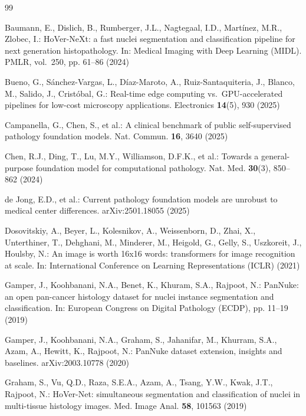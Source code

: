 \documentclass[runningheads]{llncs}
\begin{document}
%
%
\begin{thebibliography}{99}

Baumann, E., Dislich, B., Rumberger, J.L., Nagtegaal, I.D., Mart\'inez, M.R., Zlobec, I.: HoVer-NeXt: a fast nuclei segmentation and classification pipeline for next generation histopathology. In: Medical Imaging with Deep Learning (MIDL). PMLR, vol.~250, pp. 61--86 (2024)

Bueno, G., S\'anchez-Vargas, L., D\'iaz-Maroto, A., Ruiz-Santaquiteria, J., Blanco, M., Salido, J., Crist\'obal, G.: Real-time edge computing vs.\ GPU-accelerated pipelines for low-cost microscopy applications. Electronics \textbf{14}(5), 930 (2025)

Campanella, G., Chen, S., et al.: A clinical benchmark of public self-supervised pathology foundation models. Nat. Commun. \textbf{16}, 3640 (2025)

Chen, R.J., Ding, T., Lu, M.Y., Williamson, D.F.K., et al.: Towards a general-purpose foundation model for computational pathology. Nat. Med. \textbf{30}(3), 850--862 (2024)

de Jong, E.D., et al.: Current pathology foundation models are unrobust to medical center differences. arXiv:2501.18055 (2025)

Dosovitskiy, A., Beyer, L., Kolesnikov, A., Weissenborn, D., Zhai, X., Unterthiner, T., Dehghani, M., Minderer, M., Heigold, G., Gelly, S., Uszkoreit, J., Houlsby, N.: An image is worth 16x16 words: transformers for image recognition at scale. In: International Conference on Learning Representations (ICLR) (2021)

Gamper, J., Koohbanani, N.A., Benet, K., Khuram, S.A., Rajpoot, N.: PanNuke: an open pan-cancer histology dataset for nuclei instance segmentation and classification. In: European Congress on Digital Pathology (ECDP), pp. 11--19 (2019)

Gamper, J., Koohbanani, N.A., Graham, S., Jahanifar, M., Khurram, S.A., Azam, A., Hewitt, K., Rajpoot, N.: PanNuke dataset extension, insights and baselines. arXiv:2003.10778 (2020)

Graham, S., Vu, Q.D., Raza, S.E.A., Azam, A., Tsang, Y.W., Kwak, J.T., Rajpoot, N.: HoVer-Net: simultaneous segmentation and classification of nuclei in multi-tissue histology images. Med. Image Anal. \textbf{58}, 101563 (2019)


\end{thebibliography}
\end{document}
